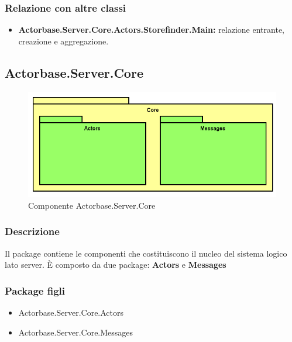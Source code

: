 \documentclass[a4paper]{article}
\begin{document}
			\subsubsection{Relazione con altre classi}
			\begin{itemize}
				\item \textbf{Actorbase.Server.Core.Actors.Storefinder.Main:} relazione entrante, creazione e aggregazione. 
			\end{itemize}
			
		\subsection{Actorbase.Server.Core}
			\begin{figure} [H]
			\centering
			\includegraphics[scale=0.55]{Server/Package/CoreLevel.png}
			\caption{Componente Actorbase.Server.Core}
			\end{figure}
			\subsubsection{Descrizione}
				Il package contiene le componenti che costituiscono il nucleo del sistema logico lato server. È composto da due package: \textbf{Actors} e \textbf{Messages}
			\subsubsection{Package figli}
			\begin{itemize}
				\item Actorbase.Server.Core.Actors
				\item Actorbase.Server.Core.Messages
			\end{itemize}
			
\end{document}
